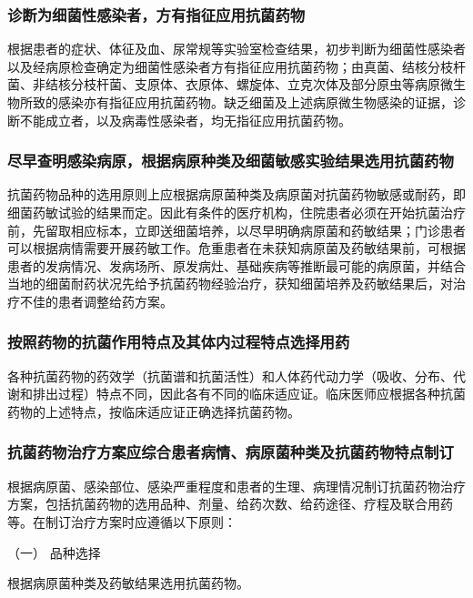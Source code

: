 \subsubsection{诊断为细菌性感染者，方有指征应用抗菌药物}

根据患者的症状、体征及血、尿常规等实验室检查结果，初步判断为细菌性感染者以及经病原检查确定为细菌性感染者方有指征应用抗菌药物；由真菌、结核分枝杆菌、非结核分枝杆菌、支原体、衣原体、螺旋体、立克次体及部分原虫等病原微生物所致的感染亦有指征应用抗菌药物。缺乏细菌及上述病原微生物感染的证据，诊断不能成立者，以及病毒性感染者，均无指征应用抗菌药物。

\subsubsection{尽早查明感染病原，根据病原种类及细菌敏感实验结果选用抗菌药物}

抗菌药物品种的选用原则上应根据病原菌种类及病原菌对抗菌药物敏感或耐药，即细菌药敏试验的结果而定。因此有条件的医疗机构，住院患者必须在开始抗菌治疗前，先留取相应标本，立即送细菌培养，以尽早明确病原菌和药敏结果；门诊患者可以根据病情需要开展药敏工作。危重患者在未获知病原菌及药敏结果前，可根据患者的发病情况、发病场所、原发病灶、基础疾病等推断最可能的病原菌，并结合当地的细菌耐药状况先给予抗菌药物经验治疗，获知细菌培养及药敏结果后，对治疗不佳的患者调整给药方案。

\subsubsection{按照药物的抗菌作用特点及其体内过程特点选择用药}

各种抗菌药物的药效学（抗菌谱和抗菌活性）和人体药代动力学（吸收、分布、代谢和排出过程）特点不同，因此各有不同的临床适应证。临床医师应根据各种抗菌药物的上述特点，按临床适应证正确选择抗菌药物。

\subsubsection{抗菌药物治疗方案应综合患者病情、病原菌种类及抗菌药物特点制订}

根据病原菌、感染部位、感染严重程度和患者的生理、病理情况制订抗菌药物治疗方案，包括抗菌药物的选用品种、剂量、给药次数、给药途径、疗程及联合用药等。在制订治疗方案时应遵循以下原则：

\hypertarget{text00430.htmlux5cux23CHP17-7-1-4-1}{}
（一） 品种选择

根据病原菌种类及药敏结果选用抗菌药物。

